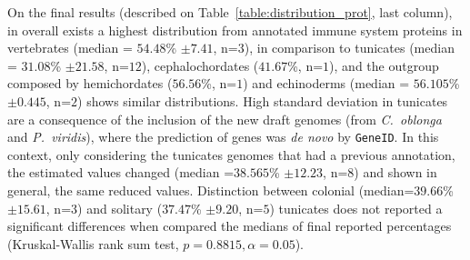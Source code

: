 \documentclass[11pt]{article}
\begin{document}
On the final results (described on Table~\ref{table:distribution_prot}, last column),
in overall exists a highest distribution from annotated immune system proteins 
in vertebrates (median = $54.48$\% $\pm 7.41$, n=$3$), in comparison to tunicates 
(median = $31.08$\% $\pm 21.58$, n=$12$), cephalochordates ($41.67$\%, n=$1$), and 
the outgroup composed by hemichordates ($56.56$\%, n=$1$) and echinoderms (median = 
$56.105$\% $\pm 0.445$, n=$2$) shows similar distributions. High standard deviation in 
tunicates are a consequence of the inclusion of the new draft genomes 
(from \textit{C.\ oblonga} and \textit{P.\ viridis}), where the prediction of genes 
was \textsl{de novo} by \texttt{GeneID}. In this context, only considering the tunicates 
genomes that had a previous annotation, the estimated values changed 
(median =$38.565$\% $\pm 12.23$, n=$8$) and shown in general, the same reduced values. 
Distinction between colonial (median=$39.66$\% $\pm 15.61$, n=$3$) and 
solitary ($37.47$\% $\pm 9.20$, n=$5$) tunicates does not reported a significant differences
when compared the medians of final reported percentages (Kruskal-Wallis rank sum test,
$p=0.8815, \alpha=0.05$).
\end{document}
